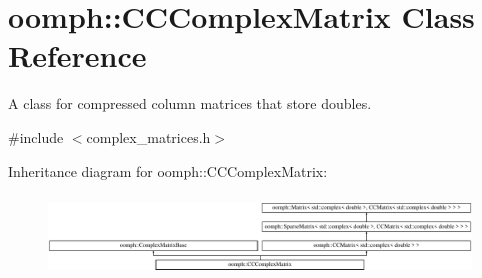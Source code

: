 \hypertarget{classoomph_1_1CCComplexMatrix}{}\section{oomph\+:\+:C\+C\+Complex\+Matrix Class Reference}
\label{classoomph_1_1CCComplexMatrix}


A class for compressed column matrices that store doubles.  




{\ttfamily \#include $<$complex\+\_\+matrices.\+h$>$}

Inheritance diagram for oomph\+:\+:C\+C\+Complex\+Matrix\+:\begin{figure}[H]
\begin{center}
\leavevmode
\includegraphics[height=2.204725cm]{classoomph_1_1CCComplexMatrix}
\end{center}
\end{figure}
